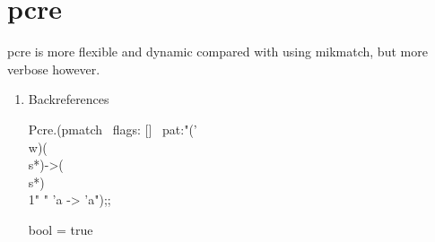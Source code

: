 \section{pcre}
\label{sec:pcre}


pcre is more flexible and dynamic compared with using mikmatch, but
more verbose however.
\begin{enumerate}
\item Backreferences

  \begin{redcode}
 Pcre.(pmatch ~flags: [] ~pat:"('\\w)(\\s*)->(\\s*)\\1" " 'a -> 'a");;    
\end{redcode}
\begin{bluecode}
bool = true  
\end{bluecode}

\end{enumerate}
